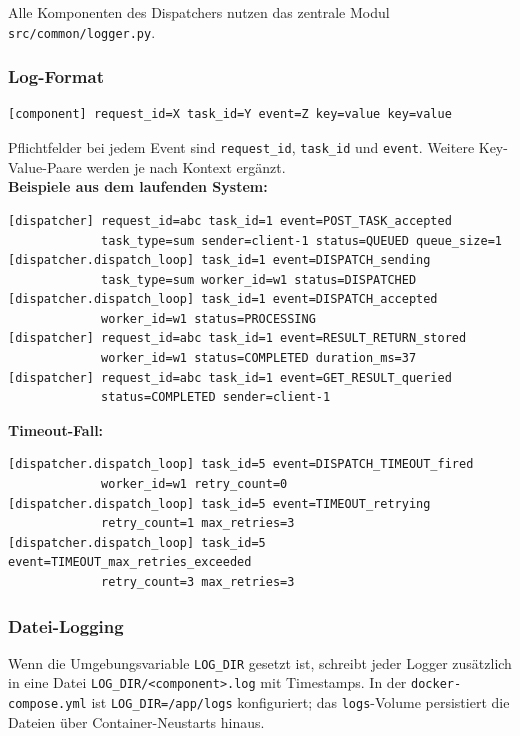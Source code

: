 Alle Komponenten des Dispatchers nutzen das zentrale Modul
\texttt{src/common/logger.py}.
\subsubsection*{Log-Format}
\begin{lstlisting}[language={},caption={Strukturiertes Log-Format}]
[component] request_id=X task_id=Y event=Z key=value key=value
\end{lstlisting}
Pflichtfelder bei jedem Event sind \texttt{request\_id}, \texttt{task\_id} und \texttt{event}.
Weitere Key-Value-Paare werden je nach Kontext ergänzt.\\
\noindent \textbf{Beispiele aus dem laufenden System:}

\begin{lstlisting}[language={},caption={Log-Ausgaben Dispatcher (Normalfall)}]
[dispatcher] request_id=abc task_id=1 event=POST_TASK_accepted
             task_type=sum sender=client-1 status=QUEUED queue_size=1
[dispatcher.dispatch_loop] task_id=1 event=DISPATCH_sending
             task_type=sum worker_id=w1 status=DISPATCHED
[dispatcher.dispatch_loop] task_id=1 event=DISPATCH_accepted
             worker_id=w1 status=PROCESSING
[dispatcher] request_id=abc task_id=1 event=RESULT_RETURN_stored
             worker_id=w1 status=COMPLETED duration_ms=37
[dispatcher] request_id=abc task_id=1 event=GET_RESULT_queried
             status=COMPLETED sender=client-1
\end{lstlisting}
\textbf{Timeout-Fall:}

\begin{lstlisting}[language={},caption={Log-Ausgaben Dispatcher (Timeout-Fall)}]
[dispatcher.dispatch_loop] task_id=5 event=DISPATCH_TIMEOUT_fired
             worker_id=w1 retry_count=0
[dispatcher.dispatch_loop] task_id=5 event=TIMEOUT_retrying
             retry_count=1 max_retries=3
[dispatcher.dispatch_loop] task_id=5 event=TIMEOUT_max_retries_exceeded
             retry_count=3 max_retries=3
\end{lstlisting}

\subsubsection*{Datei-Logging}

Wenn die Umgebungsvariable \texttt{LOG\_DIR} gesetzt ist, schreibt jeder Logger
zusätzlich in eine Datei \texttt{LOG\_DIR/<component>.log} mit Timestamps.
In der \texttt{docker-compose.yml} ist \texttt{LOG\_DIR=/app/logs} konfiguriert;
das \texttt{logs}-Volume persistiert die Dateien über Container-Neustarts hinaus.


